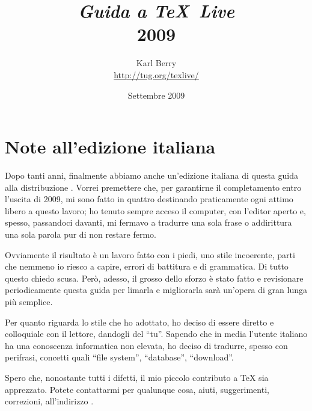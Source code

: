 \documentclass{article}
\begin{document}
\title{%
  {\huge \textit{Guida a \TeX\ Live}\\\smallskip}%
  {\LARGE \textsf{\TL{} 2009}}%
}

\author{Karl Berry\\[3mm]
        \url{http://tug.org/texlive/}
       }

\date{Settembre 2009}

\maketitle

\begin{multicols}{2}
\tableofcontents
\end{multicols}


\section*{Note all'edizione italiana}

Dopo tanti anni, finalmente abbiamo anche un'edizione italiana di questa
guida alla distribuzione \TL. Vorrei premettere che, per garantirne il
completamento entro l'uscita di \TL{} 2009, mi sono fatto in quattro
destinando praticamente ogni attimo libero a questo lavoro; ho tenuto
sempre acceso il computer, con l'editor aperto e, spesso, passandoci
davanti, mi fermavo a tradurre una sola frase o addirittura una sola
parola pur di non restare fermo.

Ovviamente il risultato è un lavoro fatto con i piedi, uno stile
incoerente, parti che nemmeno io riesco a capire, errori di battitura e di
grammatica. Di tutto questo chiedo scusa. Però, adesso, il grosso dello
sforzo è stato fatto e revisionare periodicamente questa guida per limarla
e migliorarla sarà un'opera di gran lunga più semplice.

Per quanto riguarda lo stile che ho adottato, ho deciso di essere diretto
e colloquiale con il lettore, dandogli del ``tu''. Sapendo che in media
l'utente italiano ha una conoscenza informatica non elevata, ho deciso di
tradurre, spesso con perifrasi, concetti quali ``file system'',
``database'', ``download''.

Spero che, nonostante tutti i difetti, il mio piccolo contributo a \TeX{}
sia apprezzato. Potete contattarmi per qualunque cosa, aiuti,
suggerimenti, correzioni, all'indirizzo .
\end{document}
